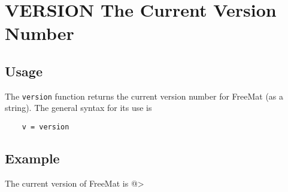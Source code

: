\section{VERSION The Current Version Number}

\subsection{Usage}

The \verb|version| function returns the current version number for
FreeMat (as a string).  The general syntax for its use is
\begin{verbatim}
    v = version
\end{verbatim}
\subsection{Example}

The current version of FreeMat is
@>
